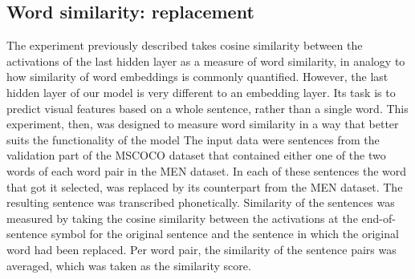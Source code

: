 \subsection{Word similarity: replacement}
The experiment previously described takes cosine similarity between the activations of the last hidden layer as a measure of word similarity, in analogy to how similarity of word embeddings is commonly quantified. However, the last hidden layer of our model is very different to an embedding layer. Its task is to predict visual features based on a whole sentence, rather than a single word. This experiment, then, was designed to measure word similarity in a way that better suits the functionality of the model %
The input data were sentences from the validation part of the MSCOCO dataset that contained either one of the two words of each word pair in the MEN dataset. In each of these sentences %
the word that got it selected, was replaced by its counterpart from the MEN dataset. The resulting sentence was transcribed phonetically. Similarity of the sentences was measured by taking the cosine similarity between the activations at the end-of-sentence symbol for the original sentence and the sentence in which the original word had been replaced. Per word pair, the similarity of the sentence pairs was averaged, which was taken as the similarity score. %

